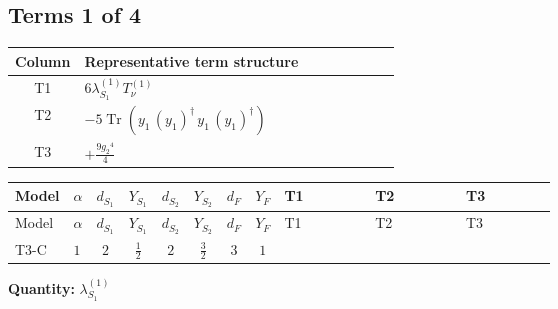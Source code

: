 \documentclass[8pt]{article}
\begin{document}
\begin{landscape}
\subsection*{Terms 1 of 4}
\begin{center}
\begin{tabular}{@{}c >{\raggedright\arraybackslash}p{0.82\linewidth}@{}}
\toprule
Column & Representative term structure \\
\midrule
T1 & \(\displaystyle 6 {\lambda_{S_1}^{(1)}} T_{\nu}^{(1)}\) \\
\midrule
T2 & \(\displaystyle -5 \operatorname{Tr}\!\left({y_1}\,\left({y_1}\right)^{\dagger}\,{y_1}\,\left({y_1}\right)^{\dagger}\right)\) \\
\midrule
T3 & \(\displaystyle +\frac{9 {g_2}^4}{4}\) \\
\midrule
\bottomrule
\end{tabular}
\end{center}
\smallskip
\tiny
\begin{longtable}{@{}llcccccc >{\raggedright\arraybackslash}p{0.21\linewidth} >{\raggedright\arraybackslash}p{0.21\linewidth} >{\raggedright\arraybackslash}p{0.21\linewidth}@{}}
\toprule
Model & $\alpha$ & $d_{S_1}$ & $Y_{S_1}$ & $d_{S_2}$ & $Y_{S_2}$ & $d_F$ & $Y_F$ & T1 & T2 & T3 \\
\midrule
\endfirsthead
\toprule
Model & $\alpha$ & $d_{S_1}$ & $Y_{S_1}$ & $d_{S_2}$ & $Y_{S_2}$ & $d_F$ & $Y_F$ & T1 & T2 & T3 \\
\midrule
\endhead
T3-C & $1$ & $2$ & $\frac{1}{2}$ & $2$ & $\frac{3}{2}$ & $3$ & $1$ & \scriptsize\adjustbox{max width=\linewidth}{$\begin{gathered} 6 {\lambda_{S_1}^{(1)}} T_{\nu}^{(1)}\end{gathered}$} & \scriptsize\adjustbox{max width=\linewidth}{$\begin{gathered} -5 \operatorname{Tr}\!\left({y_1}\,\left({y_1}\right)^{\dagger}\,{y_1}\,\left({y_1}\right)^{\dagger}\right)\end{gathered}$} & \scriptsize\adjustbox{max width=\linewidth}{$\begin{gathered} +\frac{9 {g_2}^4}{4}\end{gathered}$} \\
\midrule
\bottomrule
\end{longtable}
\clearpage
\noindent\textbf{Quantity: }$\lambda_{S_1}^{(1)}$\par\smallskip

\end{landscape}
\end{document}
